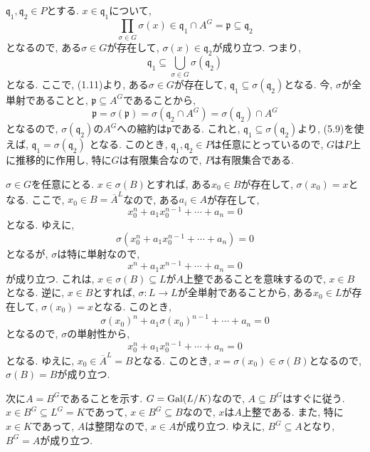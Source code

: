 \documentclass[dvipdfmx]{jsarticle}
\begin{document}
    \begin{problem}
        $\mathfrak{q}_1, \mathfrak{q}_2 \in P$とする.
        $x \in \mathfrak{q}_1$について,
        \[
            \prod_{\sigma \in G}\sigma(x) \in \mathfrak{q}_1 \cap A^G = \mathfrak{p} \subseteq \mathfrak{q}_2
        \]
        となるので,
        ある$\sigma \in G$が存在して, $\sigma(x) \in \mathfrak{q}_2$が成り立つ.
        つまり,
        \[
            \mathfrak{q}_1 \subseteq \bigcup_{\sigma \in G} \sigma(\mathfrak{q}_2)
        \]
        となる.
        ここで, (1.11)より, ある$\sigma \in G$が存在して,
        $\mathfrak{q}_1 \subseteq \sigma(\mathfrak{q}_2)$となる.
        今, $\sigma$が全単射であることと, $\mathfrak{p} \subseteq A^G$であることから,
        \[
            \mathfrak{p} = \sigma(\mathfrak{p}) = \sigma(\mathfrak{q}_2 \cap A^G) = \sigma(\mathfrak{q}_2) \cap A^G
        \]
        となるので, $\sigma(\mathfrak{q}_2)$の$A^G$への縮約は$\mathfrak{p}$である.
        これと, $\mathfrak{q}_1 \subseteq \sigma(\mathfrak{q}_2)$より,
        (5.9)を使えば, $\mathfrak{q}_1 = \sigma(\mathfrak{q}_2)$
        となる.
        このとき, $\mathfrak{q}_1, \mathfrak{q}_2 \in P$は任意にとっているので,
        $G$は$P$上に推移的に作用し,
        特に$G$は有限集合なので, $P$は有限集合である.
    \end{problem}

    \begin{problem}
        $\sigma \in G$を任意にとる.
        $x \in \sigma(B)$とすれば, ある$x_0 \in B$が存在して, $\sigma(x_0) = x$となる.
        ここで, $x_0 \in B  = \overline{A}^L$なので,
        ある$a_i \in A$が存在して,
        \[
            x_0^n + a_1 x_0^{n-1} + \cdots + a_n = 0
        \]
        となる.
        ゆえに,
        \[
            \sigma(x^n_0 + a_1 x^{n-1}_0 + \cdots + a_n) = 0
        \]
        となるが, $\sigma$は特に単射なので,
        \[
            x^n + a_1 x^{n-1} + \cdots + a_n = 0
        \]
        が成り立つ.
        これは, $x \in \sigma(B) \subseteq L$が$A$上整であることを意味するので,
        $x \in B$となる.
        逆に,
        $x \in B$とすれば, $\sigma: L \to L$が全単射であることから,
        ある$x_0 \in L$が存在して, $\sigma(x_0) = x$となる.
        このとき,
        \[
            \sigma(x_0)^n + a_1 \sigma(x_0)^{n-1} + \cdots + a_n = 0
        \]
        となるので, $\sigma$の単射性から,
        \[
            x^n_0 + a_1 x^{n-1}_0 + \cdots + a_n = 0
        \]
        となる.
        ゆえに, $x_0 \in \overline{A}^L = B$となる.
        このとき, $x = \sigma(x_0) \in \sigma(B)$となるので, $\sigma(B) = B$が成り立つ.

        次に$A = B^G$であることを示す.
        $G = \operatorname{Gal}(L/K)$なので, $A \subseteq B^G$はすぐに従う.
        $x \in B^G \subseteq L^G = K$であって,
        $x \in B^G \subseteq B$なので, $x$は$A$上整である.
        また, 特に$x \in K$であって, $A$は整閉なので, $x \in A$が成り立つ.
        ゆえに, $B^G \subseteq A$となり, $B^G = A$が成り立つ.
    \end{problem}
\end{document}
